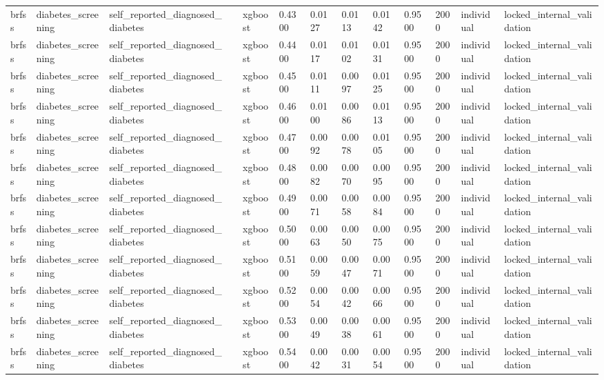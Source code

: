 \begin{tabular}{lllllllllllll}
brfss & diabetes\_screening & self\_reported\_diagnosed\_diabetes &  & xgboost & 0.4300 & 0.0127 & 0.0113 & 0.0142 & 0.9500 & 2000 & individual & locked\_internal\_validation \\
brfss & diabetes\_screening & self\_reported\_diagnosed\_diabetes &  & xgboost & 0.4400 & 0.0117 & 0.0102 & 0.0131 & 0.9500 & 2000 & individual & locked\_internal\_validation \\
brfss & diabetes\_screening & self\_reported\_diagnosed\_diabetes &  & xgboost & 0.4500 & 0.0111 & 0.0097 & 0.0125 & 0.9500 & 2000 & individual & locked\_internal\_validation \\
brfss & diabetes\_screening & self\_reported\_diagnosed\_diabetes &  & xgboost & 0.4600 & 0.0100 & 0.0086 & 0.0113 & 0.9500 & 2000 & individual & locked\_internal\_validation \\
brfss & diabetes\_screening & self\_reported\_diagnosed\_diabetes &  & xgboost & 0.4700 & 0.0092 & 0.0078 & 0.0105 & 0.9500 & 2000 & individual & locked\_internal\_validation \\
brfss & diabetes\_screening & self\_reported\_diagnosed\_diabetes &  & xgboost & 0.4800 & 0.0082 & 0.0070 & 0.0095 & 0.9500 & 2000 & individual & locked\_internal\_validation \\
brfss & diabetes\_screening & self\_reported\_diagnosed\_diabetes &  & xgboost & 0.4900 & 0.0071 & 0.0058 & 0.0084 & 0.9500 & 2000 & individual & locked\_internal\_validation \\
brfss & diabetes\_screening & self\_reported\_diagnosed\_diabetes &  & xgboost & 0.5000 & 0.0063 & 0.0050 & 0.0075 & 0.9500 & 2000 & individual & locked\_internal\_validation \\
brfss & diabetes\_screening & self\_reported\_diagnosed\_diabetes &  & xgboost & 0.5100 & 0.0059 & 0.0047 & 0.0071 & 0.9500 & 2000 & individual & locked\_internal\_validation \\
brfss & diabetes\_screening & self\_reported\_diagnosed\_diabetes &  & xgboost & 0.5200 & 0.0054 & 0.0042 & 0.0066 & 0.9500 & 2000 & individual & locked\_internal\_validation \\
brfss & diabetes\_screening & self\_reported\_diagnosed\_diabetes &  & xgboost & 0.5300 & 0.0049 & 0.0038 & 0.0061 & 0.9500 & 2000 & individual & locked\_internal\_validation \\
brfss & diabetes\_screening & self\_reported\_diagnosed\_diabetes &  & xgboost & 0.5400 & 0.0042 & 0.0031 & 0.0054 & 0.9500 & 2000 & individual & locked\_internal\_validation \\

\end{tabular}
